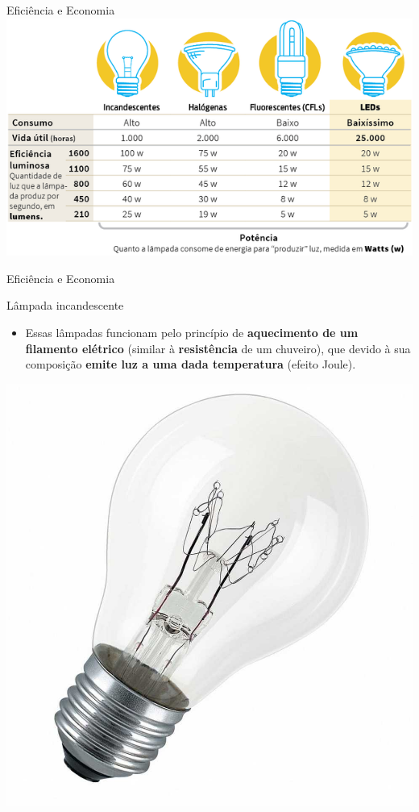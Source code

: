 \begin{frame}{Eficiência e Economia}
	\centering
	\includegraphics[width=0.9\linewidth]{Figuras/Ch07/fig8}
\end{frame}


\begin{frame}{Eficiência e Economia}
	\begin{block}{Lâmpada incandescente}
		\begin{itemize}
			\item Essas lâmpadas funcionam pelo princípio de \textbf{aquecimento de um filamento elétrico} (similar à \textbf{resistência} de um chuveiro), que devido à sua composição \textbf{emite luz a uma dada temperatura} (efeito Joule).
		\end{itemize}
	\end{block}

	\bigskip

	\centering
	\includegraphics[height=0.5\textheight]{Figuras/Ch07/fig9}
\end{frame}


